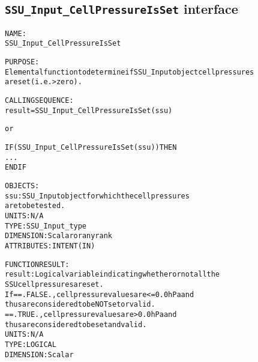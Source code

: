 \subsection{\texttt{SSU\_Input\_CellPressureIsSet} interface}
  \label{sec:SSU_Input_CellPressureIsSet_interface}
  \begin{alltt}
 
  NAME:
        SSU_Input_CellPressureIsSet
  
  PURPOSE:
        Elemental function to determine if SSU_Input object cell pressures
        are set (i.e. > zero).
 
  CALLING SEQUENCE:
        result = SSU_Input_CellPressureIsSet( ssu )
 
          or
 
        IF ( SSU_Input_CellPressureIsSet( ssu ) ) THEN
          ...
        END IF
 
  OBJECTS:
        ssu:       SSU_Input object for which the cell pressures 
                   are to be tested.
                   UNITS:      N/A
                   TYPE:       SSU_Input_type
                   DIMENSION:  Scalar or any rank
                   ATTRIBUTES: INTENT(IN)
 
  FUNCTION RESULT:
        result:    Logical variable indicating whether or not all the
                   SSU cell pressures are set.
                   If == .FALSE., cell pressure values are <= 0.0hPa and
                                  thus are considered to be NOT set or valid.
                      == .TRUE.,  cell pressure values are > 0.0hPa and
                                  thus are considered to be set and valid.
                   UNITS:      N/A
                   TYPE:       LOGICAL
                   DIMENSION:  Scalar
 
  \end{alltt}
